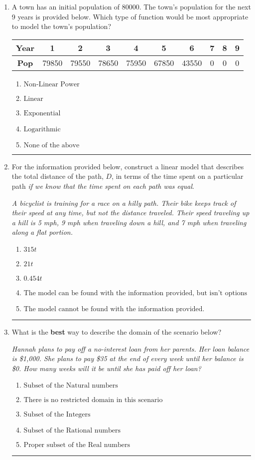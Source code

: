 \documentclass[14pt]{extbook}
\newcommand{\litem}[1]{\item#1\hspace*{-1cm}\rule{\textwidth}{0.4pt}}
\begin{document}
\begin{enumerate}
{\begin{enumerate}[label=\Alph*.]
\end{enumerate} }
\litem{
A town has an initial population of 80000. The town's population for the next 9 years is provided below. Which type of function would be most appropriate to model the town's population?

\begin{tabular}{c|c|c|c|c|c|c|c|c|c}
\textbf{Year} &1 &2 &3 &4 &5 &6 &7 &8 &9\tabularnewline \hline
\textbf{Pop} &79850 &79550 &78650 &75950 &67850 &43550 &0 &0 &0\end{tabular}\begin{enumerate}[label=\Alph*.]
\item \( \text{Non-Linear Power} \)
\item \( \text{Linear} \)
\item \( \text{Exponential} \)
\item \( \text{Logarithmic} \)
\item \( \text{None of the above} \)

\end{enumerate} }
\litem{
For the information provided below, construct a linear model that describes the total distance of the path, $D$, in terms of the time spent on a particular path \textit{if we know that the time spent on each path was equal}.
\begin{center}
    \textit{ A bicyclist is training for a race on a hilly path. Their bike keeps track of their speed at any time, but not the distance traveled. Their speed traveling up a hill is 5 mph, 9 mph when traveling down a hill, and 7 mph when traveling along a flat portion. }
\end{center}
\begin{enumerate}[label=\Alph*.]
\item \( 315 t \)
\item \( 21 t \)
\item \( 0.454 t \)
\item \( \text{The model can be found with the information provided, but isn't options 1-3.} \)
\item \( \text{The model cannot be found with the information provided.} \)

\end{enumerate} }
\litem{
What is the \textbf{best} way to describe the domain of the scenario below?
\begin{center}
    \textit{ Hannah plans to pay off a no-interest loan from her parents. Her loan balance is \$1,000. She plans to pay \$35 at the end of every week until her balance is \$0. How many weeks will it be until she has paid off her loan? }
\end{center}
\begin{enumerate}[label=\Alph*.]
\item \( \text{Subset of the Natural numbers} \)
\item \( \text{There is no restricted domain in this scenario} \)
\item \( \text{Subset of the Integers} \)
\item \( \text{Subset of the Rational numbers} \)
\item \( \text{Proper subset of the Real numbers} \)


\end{enumerate}}
\end{enumerate}
\end{document}

